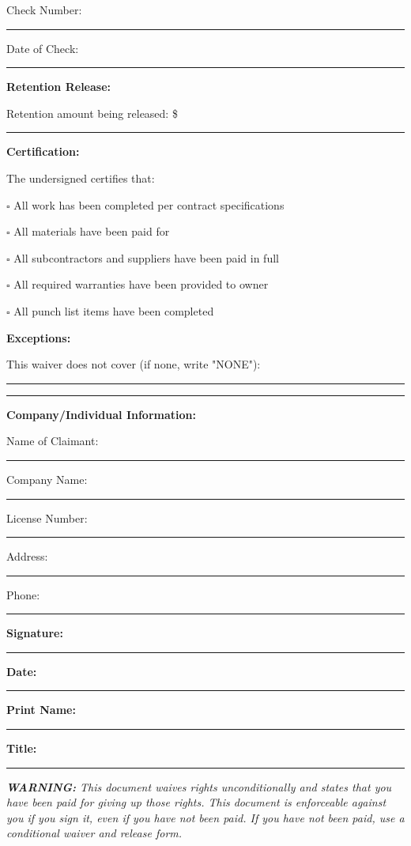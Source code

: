 \documentclass[11pt,letterpaper]{article}
\begin{document}
Check Number: \rule{4cm}{0.4pt}

Date of Check: \rule{4cm}{0.4pt}

\vspace{6pt}

\textbf{Retention Release:}

Retention amount being released: \$ \rule{5cm}{0.4pt}

\vspace{6pt}

\textbf{Certification:}

The undersigned certifies that:

$\square$ All work has been completed per contract specifications

$\square$ All materials have been paid for

$\square$ All subcontractors and suppliers have been paid in full

$\square$ All required warranties have been provided to owner

$\square$ All punch list items have been completed

\vspace{6pt}

\textbf{Exceptions:}

This waiver does not cover (if none, write "NONE"):

\rule{14cm}{0.4pt}

\rule{14cm}{0.4pt}

\vspace{12pt}

\textbf{Company/Individual Information:}

Name of Claimant: \rule{8cm}{0.4pt}

Company Name: \rule{8cm}{0.4pt}

License Number: \rule{5cm}{0.4pt}

Address: \rule{10cm}{0.4pt}

Phone: \rule{4cm}{0.4pt}

\vspace{12pt}

\textbf{Signature:} \rule{6cm}{0.4pt} \textbf{Date:} \rule{3cm}{0.4pt}

\textbf{Print Name:} \rule{6cm}{0.4pt}

\textbf{Title:} \rule{6cm}{0.4pt}

\vspace{6pt}

\textit{\textbf{WARNING:} This document waives rights unconditionally and states that you have been paid for giving up those rights. This document is enforceable against you if you sign it, even if you have not been paid. If you have not been paid, use a conditional waiver and release form.}
\end{document}

